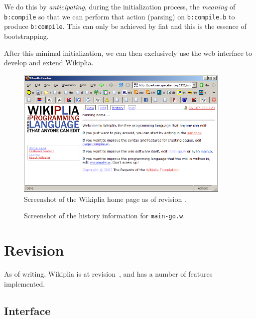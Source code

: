 \documentclass[twocolumn]{article}
\begin{document}
We do this by {\em anticipating}, during the initialization process,
the {\em meaning} of {\tt b:compile} so that we can perform that
action (parsing) on {\tt b:compile.b} to produce {\tt b:compile}. This
can only be achieved by fiat and this is the essence of bootstrapping.

After this minimal initialization, we can then exclusively use the web
interface to develop and extend Wikiplia.

\begin{figure}[t]
\begin{center}
\includegraphics[width=0.92\textwidth]{ss_homepage}
\end{center}
\caption{Screenshot of the Wikiplia home page as of revision
\currentrevision.} \label{fig:sshomepage}
\end{figure}

\begin{figure}[t]
\begin{center}
\end{center}
\caption{Screenshot of the history information for {\tt main-go.w}.
} \label{fig:sshistory}
\end{figure}

\section{Revision \currentrevision} \label{sec:current}

As of writing, Wikiplia is at revision~\currentrevision, and has
a number of features implemented.

\subsection{Interface}
\end{document}
